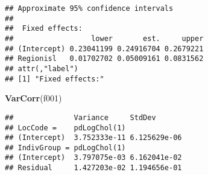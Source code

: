 \documentclass[]{article}
\newenvironment{Shaded}{\begin{snugshade}}{\end{snugshade}}
\newcommand{\KeywordTok}[1]{\textcolor[rgb]{0.13,0.29,0.53}{\textbf{#1}}}
\newcommand{\NormalTok}[1]{#1}
\begin{document}
\begin{verbatim}
## Approximate 95% confidence intervals
## 
##  Fixed effects:
##                  lower       est.     upper
## (Intercept) 0.23041199 0.24916704 0.2679221
## Regionisl   0.01702702 0.05009161 0.0831562
## attr(,"label")
## [1] "Fixed effects:"
\end{verbatim}

\begin{Shaded}
\begin{Highlighting}[]
\KeywordTok{VarCorr}\NormalTok{(f001)}
\end{Highlighting}
\end{Shaded}

\begin{verbatim}
##              Variance     StdDev      
## LocCode =    pdLogChol(1)             
## (Intercept)  3.752333e-11 6.125629e-06
## IndivGroup = pdLogChol(1)             
## (Intercept)  3.797075e-03 6.162041e-02
## Residual     1.427203e-02 1.194656e-01
\end{verbatim}
\end{document}
